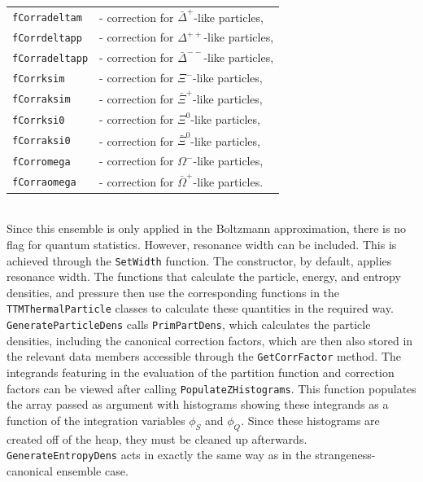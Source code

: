 \documentclass{elsarticle}
\begin{document}
\begin{tabular}{ll}
\texttt{fCorradeltam}    &- correction for $\bar{\Delta}^+$-like particles,\\
\texttt{fCorrdeltapp}    &- correction for $\Delta^{++}$-like particles,\\
\texttt{fCorradeltapp}   &- correction for $\bar{\Delta}^{--}$-like particles,\\
\texttt{fCorrksim}       &- correction for $\Xi^{-}$-like particles,\\
\texttt{fCorraksim}      &- correction for $\bar{\Xi}^+$-like particles,\\
\texttt{fCorrksi0}       &- correction for $\Xi^0$-like particles,\\
\texttt{fCorraksi0}      &- correction for $\bar{\Xi}^0$-like particles,\\
\texttt{fCorromega}      &- correction for $\Omega^-$-like particles,\\
\texttt{fCorraomega}     &- correction for $\bar{\Omega}^+$-like particles.
\end{tabular}\\

Since this ensemble is only applied in the Boltzmann approximation, there is no flag for quantum 
statistics. However, resonance width can be included. This is achieved through the 
\texttt{SetWidth} function. The constructor, by default, applies resonance width. The 
functions that calculate the particle, energy, and entropy densities, and pressure then use the 
corresponding functions in the \texttt{TTMThermalParticle} classes to calculate these 
quantities in the required way.\\ 

\texttt{GenerateParticleDens} calls \texttt{PrimPartDens}, which calculates the particle densities, 
including the canonical correction factors, which are then also stored in the relevant data members 
accessible through the \texttt{GetCorrFactor} method. The integrands featuring in the evaluation 
of the partition function and correction factors can be viewed after calling 
\texttt{PopulateZHistograms}. This function populates the array passed as argument with 
histograms showing these integrands as a function of the integration variables $\phi_S$ and 
$\phi_Q$. Since these histograms 
are created off of the heap, they must be cleaned up afterwards.\\ 

\texttt{GenerateEntropyDens} acts in exactly the same way as in the strangeness-canonical ensemble case.\\
\end{document}

